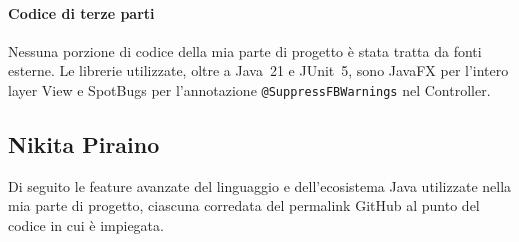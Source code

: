 \documentclass[11pt, a4paper, oneside]{report}
\begin{document}
\paragraph{Codice di terze parti}
Nessuna porzione di codice della mia parte di progetto è stata tratta
da fonti esterne. Le librerie utilizzate, oltre a Java~21 e JUnit~5,
sono JavaFX per l'intero layer View e SpotBugs per l'annotazione
\texttt{@SuppressFBWarnings} nel Controller.

\subsection{Nikita Piraino}
Di seguito le feature avanzate del linguaggio e dell'ecosistema Java utilizzate
nella mia parte di progetto, ciascuna corredata del permalink GitHub al punto
del codice in cui \`e impiegata.
\end{document}
